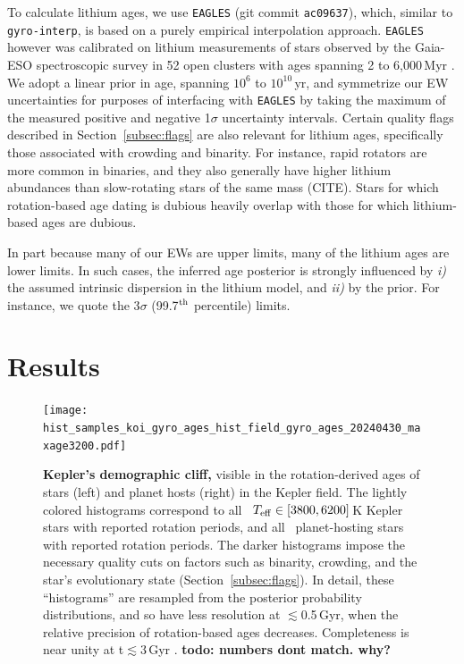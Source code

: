 \documentclass[11pt,twocolumn,tighten]{aastex63}
\begin{document}
To calculate lithium ages, we use \texttt{EAGLES} (git commit
\texttt{ac09637}), which, similar to
\texttt{gyro-interp}, is based on a purely empirical interpolation
approach.  \texttt{EAGLES} however was calibrated on lithium measurements of
stars observed by the
Gaia-ESO spectroscopic survey in 52 open clusters with ages spanning 2
to 6{,}000\,Myr \citep{Jeffries_2023}.  We adopt a linear prior in
age, spanning $10^6$ to $10^{10}$\,yr, and symmetrize our EW
uncertainties for purposes of interfacing with \texttt{EAGLES} by
taking the maximum of the measured positive and negative 1$\sigma$
uncertainty intervals.
Certain quality flags described in Section~\ref{subsec:flags} are also
relevant for lithium ages, specifically those associated with
crowding and binarity.
For instance, rapid rotators are more common in binaries, and they also
generally have higher lithium abundances than slow-rotating stars of the
same mass (CITE).
Stars for which rotation-based age dating is dubious heavily overlap
with those for which lithium-based ages are dubious.

In part because many of our EWs are upper limits, 
many of the lithium ages are lower limits.
In such cases,  the inferred age posterior is strongly influenced by
{\it i)} the assumed intrinsic dispersion in the lithium model,
and {\it ii)} by the prior.
For instance, 
 we quote the 3$\sigma$ (99.7$^{\rm th}$ percentile) limits.


\section{Results}
\label{sec:results}

\begin{figure}[!t]
  \begin{center}
    \leavevmode
    \texttt{[image: hist\_samples\_koi\_gyro\_ages\_hist\_field\_gyro\_ages\_20240430\_maxage3200.pdf]}
  \end{center}
  \vspace{-0.6cm}
  \caption{
    {\bf Kepler's demographic cliff,} visible in the rotation-derived
    ages of stars (left) and planet hosts (right) in the Kepler field.
    The lightly colored histograms correspond to all
    \nuniqstarsantosrotteffcut\ $T_{\rm eff}\in[3800,6200]\,$K Kepler
    stars with reported rotation periods, and all
    \nplhoststarwgyroage\ planet-hosting stars with reported rotation
    periods.
    The darker histograms impose the necessary quality cuts on factors
    such as binarity, crowding, and the star's evolutionary state
    (Section~\ref{subsec:flags}).
    In detail, these ``histograms'' are resampled from the posterior
    probability distributions, and so have less resolution at
    $\lesssim$0.5\,Gyr, when the relative precision of rotation-based
    ages decreases.
    Completeness is near unity at t$\lesssim$3\,Gyr
    \citep{2022ApJ...937...94M}.
    {\bf todo: numbers dont match.  why?}
    \label{fig:hist_tgyro}
  }
\end{figure}
\end{document}
